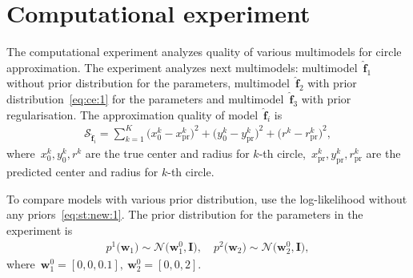 \documentclass[12pt, twoside]{article}
\numberwithin{equation}{section}
\begin{document}
\section{Computational experiment}
The computational experiment analyzes quality of various multimodels for circle approximation.
The experiment analyzes next multimodels: multimodel~$\hat{\mathbf{f}}_1$ without prior distribution for the parameters, multimodel~$\hat{\mathbf{f}}_2$ with prior distribution~\eqref{eq:ce:1} for the parameters and multimodel~$\hat{\mathbf{f}}_3$ with prior regularisation.
The approximation quality of model~$\hat{\mathbf{f}}_i$ is
\[
\label{eq:ce:ex:0:1}
\begin{aligned}
\mathcal{S}_{\hat{\mathbf{f}}_i} = \sum_{k=1}^{K}\bigr(x^{k}_{0}-x^{k}_{\text{pr}}\bigr)^2+\bigr(y^{k}_{0}-y^{k}_{\text{pr}}\bigr)^2+\bigr(r^{k}-r^{k}_{\text{pr}}\bigr)^2,
\end{aligned}
\]
where~$x^{k}_0, y^{k}_0, r^{k}$ are the true center and radius for $k$-th circle,~$x^{k}_{\text{pr}}, y^{k}_{\text{pr}}, r^{k}_{\text{pr}}$ are the predicted center and radius for $k$-th circle.

To compare models with various prior distribution, use the log-likelihood without any priors~\eqref{eq:st:new:1}.
The prior distribution for the parameters in the experiment is
\[
\label{eq:ce:1}
\begin{aligned}
p^{1}\bigr(\textbf{w}_1\bigr)\sim\mathcal{N}\bigr(\textbf{w}^{0}_{1}, \textbf{I}\bigr), \quad p^{2}\bigr(\textbf{w}_2\bigr)\sim\mathcal{N}\bigr(\textbf{w}^{0}_{2}, \textbf{I}\bigr),
\end{aligned}
\]
where~$\textbf{w}^{0}_1 = [0, 0, 0.1],\ \textbf{w}^{0}_2 = [0, 0, 2]$.
\end{document}
